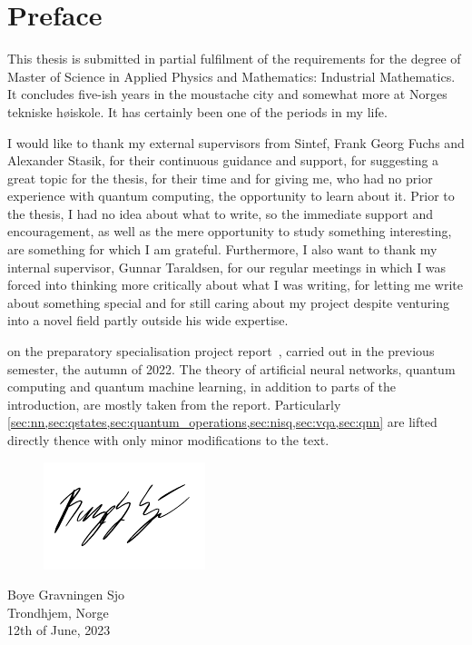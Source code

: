 \chapter{Preface}
This thesis is submitted in partial fulfilment of the requirements for the degree of Master of Science in Applied Physics and Mathematics: Industrial Mathematics.
It concludes five-ish years in the moustache city and somewhat more at Norges tekniske høiskole.
It has certainly been one of the periods in my life.

I would like to thank my external supervisors from Sintef, Frank Georg Fuchs and Alexander Stasik, for their continuous guidance and support, for suggesting a great topic for the thesis, for their time and for giving me, who had no prior experience with quantum computing, the opportunity to learn about it.
Prior to the thesis, I had no idea about what to write, so the immediate support and encouragement, as well as the mere opportunity to study something interesting, are something for which I am grateful.
Furthermore, I also want to thank my internal supervisor, Gunnar Taraldsen, for our regular meetings in which I was forced into thinking more critically about what I was writing, for letting me write about something special and for still caring about my project despite venturing into a novel field partly outside his wide expertise.

\makebox[\dimexpr\textwidth-\parindent][s]{Do note that this master's thesis is based}
on the preparatory specialisation project report~\autocite{sjo2022}, carried out in the previous semester, the autumn of 2022.
The theory of artificial neural networks, quantum computing and quantum machine learning, in addition to parts of the introduction, are mostly taken from the report.
Particularly \cref{sec:nn,sec:qstates,sec:quantum_operations,sec:nisq,sec:vqa,sec:qnn} are lifted directly thence with only minor modifications to the text.

\vspace*{0.5cm}
\begin{figure}[h]
  \raggedleft
  \includegraphics[width=0.3\linewidth]{blank.pdf}
\end{figure}
\begin{flushright}
  \vspace{-1.3cm}
  Boye Gravningen Sjo \\
  Trondhjem, Norge \\
  12th of June, 2023
\end{flushright}

\cleardoublepage